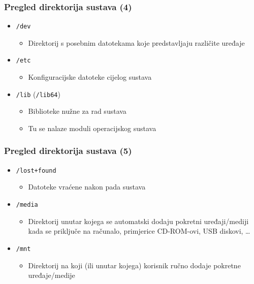\documentclass{beamer}
\begin{document}
\begin{frame}[t]
\frametitle{Pregled direktorija sustava (4)}
\begin{itemize}
  \item \texttt{/dev}
  \begin{itemize}
    \item Direktorij s posebnim datotekama koje predstavljaju različite
          uređaje
  \end{itemize}
  \item \texttt{/etc}
  \begin{itemize}
    \item Konfiguracijske datoteke cijelog sustava
  \end{itemize}
  \item \texttt{/lib} (\texttt{/lib64})
  \begin{itemize}
    \item Biblioteke nužne za rad sustava
    \item Tu se nalaze moduli operacijskog sustava
  \end{itemize}
\end{itemize}
\end{frame}

\begin{frame}[t]
\frametitle{Pregled direktorija sustava (5)}
\begin{itemize}
  \item \texttt{/lost+found}
  \begin{itemize}
    \item Datoteke vraćene nakon pada sustava
  \end{itemize}
  \item \texttt{/media}
  \begin{itemize}
    \item Direktorij unutar kojega se automatski dodaju pokretni
          uređaji/mediji kada se priključe na računalo, primjerice
          CD-ROM-ovi, USB diskovi, \ldots
  \end{itemize}
  \item \texttt{/mnt}
  \begin{itemize}
    \item Direktorij na koji (ili unutar kojega) korisnik ručno dodaje
          pokretne uređaje/medije
  \end{itemize}
\end{itemize}
\end{frame}
\end{document}
